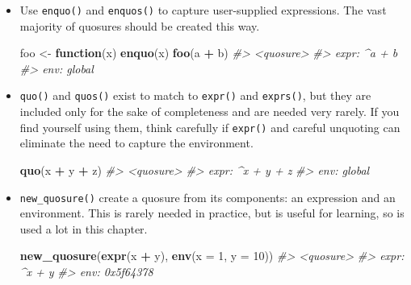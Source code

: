 \documentclass[]{book}
\makeatletter
\newenvironment{Shaded}{\begin{snugshade}}{\end{snugshade}}
\newcommand{\CommentTok}[1]{\textcolor[rgb]{0.37,0.37,0.37}{\textit{#1}}}
\newcommand{\ControlFlowTok}[1]{\textcolor[rgb]{0.27,0.27,0.27}{\textbf{#1}}}
\newcommand{\DataTypeTok}[1]{\textcolor[rgb]{0.27,0.27,0.27}{#1}}
\newcommand{\DecValTok}[1]{\textcolor[rgb]{0.06,0.06,0.06}{#1}}
\newcommand{\KeywordTok}[1]{\textcolor[rgb]{0.27,0.27,0.27}{\textbf{#1}}}
\newcommand{\NormalTok}[1]{#1}
\newcommand{\OperatorTok}[1]{\textcolor[rgb]{0.43,0.43,0.43}{\textbf{#1}}}
\newcommand{\StringTok}[1]{\textcolor[rgb]{0.5,0.5,0.5}{#1}}
\newcommand{\indexc}[1]{\index{#1@\texttt{#1}}}
\makeatother
\begin{document}
\begin{itemize}
\item
  Use \texttt{enquo()} and \texttt{enquos()} to capture user-supplied expressions.
  The vast majority of quosures should be created this way.

\begin{Shaded}
\begin{Highlighting}[]
\NormalTok{foo <-}\StringTok{ }\ControlFlowTok{function}\NormalTok{(x) }\KeywordTok{enquo}\NormalTok{(x)}
\KeywordTok{foo}\NormalTok{(a }\OperatorTok{+}\StringTok{ }\NormalTok{b)}
\CommentTok{#> <quosure>}
\CommentTok{#> expr: ^a + b}
\CommentTok{#> env:  global}
\end{Highlighting}
\end{Shaded}

  \indexc{enquo()}
\item
  \texttt{quo()} and \texttt{quos()} exist to match to \texttt{expr()} and \texttt{exprs()}, but
  they are included only for the sake of completeness and are needed very
  rarely. If you find yourself using them, think carefully if \texttt{expr()} and
  careful unquoting can eliminate the need to capture the environment.

\begin{Shaded}
\begin{Highlighting}[]
\KeywordTok{quo}\NormalTok{(x }\OperatorTok{+}\StringTok{ }\NormalTok{y }\OperatorTok{+}\StringTok{ }\NormalTok{z)}
\CommentTok{#> <quosure>}
\CommentTok{#> expr: ^x + y + z}
\CommentTok{#> env:  global}
\end{Highlighting}
\end{Shaded}

\item
  \texttt{new\_quosure()} create a quosure from its components: an expression and
  an environment. This is rarely needed in practice, but is useful for
  learning, so is used a lot in this chapter.

\begin{Shaded}
\begin{Highlighting}[]
\KeywordTok{new_quosure}\NormalTok{(}\KeywordTok{expr}\NormalTok{(x }\OperatorTok{+}\StringTok{ }\NormalTok{y), }\KeywordTok{env}\NormalTok{(}\DataTypeTok{x =} \DecValTok{1}\NormalTok{, }\DataTypeTok{y =} \DecValTok{10}\NormalTok{))}
\CommentTok{#> <quosure>}
\CommentTok{#> expr: ^x + y}
\CommentTok{#> env:  0x5f64378}
\end{Highlighting}
\end{Shaded}
\end{itemize}
\end{document}

